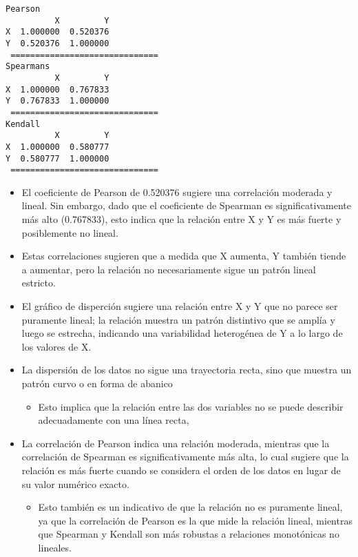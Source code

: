 \documentclass[11pt]{article}
\providecommand{\tightlist}{%
      \setlength{\itemsep}{0pt}\setlength{\parskip}{0pt}}
\begin{document}
    \begin{Verbatim}[commandchars=\\\{\}]
Pearson
          X         Y
X  1.000000  0.520376
Y  0.520376  1.000000
 ==============================
Spearmans
          X         Y
X  1.000000  0.767833
Y  0.767833  1.000000
 ==============================
Kendall
          X         Y
X  1.000000  0.580777
Y  0.580777  1.000000
 ==============================
    \end{Verbatim}

    \begin{itemize}
\tightlist
\item
  El coeficiente de Pearson de 0.520376 sugiere una correlación moderada
  y lineal. Sin embargo, dado que el coeficiente de Spearman es
  significativamente más alto (0.767833), esto indica que la relación
  entre X y Y es más fuerte y posiblemente no lineal.
\item
  Estas correlaciones sugieren que a medida que X aumenta, Y también
  tiende a aumentar, pero la relación no necesariamente sigue un patrón
  lineal estricto.
\end{itemize}

    \begin{itemize}
\tightlist
\item
  El gráfico de disperción sugiere una relación entre X y Y que no
  parece ser puramente lineal; la relación muestra un patrón distintivo
  que se amplía y luego se estrecha, indicando una variabilidad
  heterogénea de Y a lo largo de los valores de X.
\item
  La dispersión de los datos no sigue una trayectoria recta, sino que
  muestra un patrón curvo o en forma de abanico

  \begin{itemize}
  \tightlist
  \item
    Esto implica que la relación entre las dos variables no se puede
    describir adecuadamente con una línea recta,
  \end{itemize}
\item
  La correlación de Pearson indica una relación moderada, mientras que
  la correlación de Spearman es significativamente más alta, lo cual
  sugiere que la relación es más fuerte cuando se considera el orden de
  los datos en lugar de su valor numérico exacto.

  \begin{itemize}
  \tightlist
  \item
    Esto también es un indicativo de que la relación no es puramente
    lineal, ya que la correlación de Pearson es la que mide la relación
    lineal, mientras que Spearman y Kendall son más robustas a
    relaciones monotónicas no lineales.
  \end{itemize}
\end{itemize}
\end{document}
